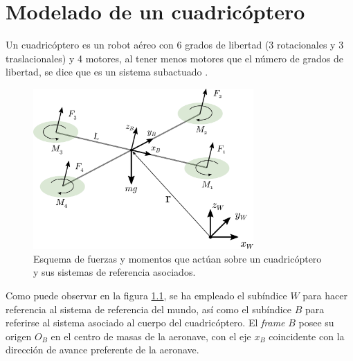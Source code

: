 \chapter{Modelado de un cuadricóptero}

Un cuadricóptero es un robot aéreo con 6 grados de libertad (3 rotacionales y 3 traslacionales) y 4 motores, al tener menos motores que el número de grados de libertad, se dice que es un sistema subactuado \cite{ferrin2011differential}\cite{MinimunSnap2011}\cite{mellinger2012trajectory}.

\begin{figure}[htb!]
	\centering
	\includegraphics[width=0.75\textwidth]{imagenes/uav_coordinate_system}
	\caption{Esquema de fuerzas y momentos que actúan sobre un cuadricóptero y sus sistemas de referencia asociados. }
	\label{modelado:uav_coordinate}
\end{figure}

Como puede observar en la figura \ref{modelado:uav_coordinate}, se ha  empleado el subíndice $W$ para hacer referencia al sistema de referencia del mundo, así como el subíndice $B$ para referirse al sistema asociado al cuerpo del cuadricóptero. El \textit{frame} $B$ posee su origen $O_B$ en el centro de masas de la aeronave, con el eje $x_B$ coincidente con la dirección de avance preferente de la aeronave.

